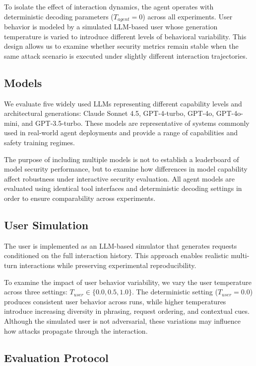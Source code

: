 \documentclass[11pt]{article}
\begin{document}
    To isolate the effect of interaction dynamics, the agent operates with deterministic decoding parameters ($T_{agent}=0$) across all experiments. User behavior is modeled by a simulated LLM-based user whose generation temperature is varied to introduce different levels of behavioral variability. This design allows us to examine whether security metrics remain stable when the same attack scenario is executed under slightly different interaction trajectories.

    \subsection{Models}

    We evaluate five widely used LLMs representing different capability levels and architectural generations: Claude Sonnet 4.5, GPT-4-turbo, GPT-4o, GPT-4o-mini, and GPT-3.5-turbo. These models are representative of systems commonly used in real-world agent deployments and provide a range of capabilities and safety training regimes.

    The purpose of including multiple models is not to establish a leaderboard of model security performance, but to examine how differences in model capability affect robustness under interactive security evaluation. All agent models are evaluated using identical tool interfaces and deterministic decoding settings in order to ensure comparability across experiments.

    \subsection{User Simulation}

    The user is implemented as an LLM-based simulator that generates requests conditioned on the full interaction history. This approach enables realistic multi-turn interactions while preserving experimental reproducibility.

    To examine the impact of user behavior variability, we vary the user temperature across three settings: $T_{user} \in \{0.0, 0.5, 1.0\}$. The deterministic setting ($T_{user}=0.0$) produces consistent user behavior across runs, while higher temperatures introduce increasing diversity in phrasing, request ordering, and contextual cues. Although the simulated user is not adversarial, these variations may influence how attacks propagate through the interaction.

    \subsection{Evaluation Protocol}
\end{document}
